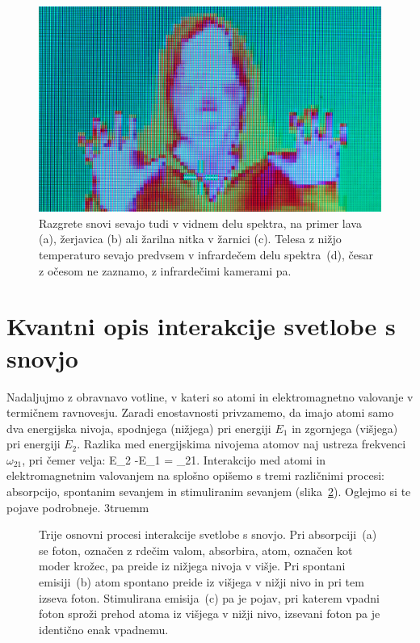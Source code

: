 \begin{figure}[ht]
\includegraphics[width=7truecm]{slike/11_photo_IR.jpg} 
\caption{Razgrete snovi sevajo tudi v 
vidnem delu spektra, na primer lava (a), žerjavica (b) ali 
žarilna nitka v žarnici (c). Telesa z nižjo temperaturo sevajo 
predvsem v infrardečem delu spektra~(d), česar z očesom ne zaznamo, z infrardečimi
kamerami pa.}
\label{fig:11_photoPlanck}
\end{figure}

\section{Kvantni opis interakcije svetlobe s snovjo}
Nadaljujmo z obravnavo votline, v kateri so atomi 
in elektromagnetno valovanje v termičnem ravnovesju. 
Zaradi enostavnosti privzamemo, da imajo atomi samo dva 
energijska nivoja, spodnjega (nižjega) pri energiji
$E_1$ in zgornjega (višjega) pri energiji $E_2$. 
Razlika med energijskima nivojema atomov naj ustreza
frekvenci $\omega_{21}$, pri čemer velja:
\beq
E_2 -E_1 = \hslash \omega_{21}.
\label{eq:11_07}
\eeq
Interakcijo med atomi in elektromagnetnim valovanjem na splošno
opišemo s tremi različnimi procesi: absorpcijo, spontanim
sevanjem in stimuliranim sevanjem (slika~\ref{fig:11_procesi}). 
Oglejmo si te pojave podrobneje.
\vglue3truemm
\begin{figure}[h!]
\centering
\def\svgwidth{145truemm} 

\caption{Trije osnovni procesi interakcije svetlobe s snovjo. Pri absorpciji~(a) 
se foton, označen z rdečim valom, absorbira, atom, označen kot moder krožec, pa 
preide iz nižjega nivoja v višje. Pri spontani emisiji~(b) atom spontano preide 
iz višjega v nižji nivo in pri tem izseva foton. Stimulirana emisija~(c) pa je pojav,
pri katerem vpadni foton sproži prehod atoma iz višjega v nižji nivo, 
izsevani foton pa je identično enak vpadnemu.
}
\label{fig:11_procesi}
\end{figure}

